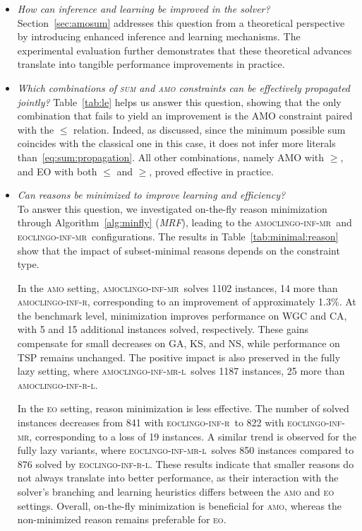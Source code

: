 \documentclass[preprint,authoryear]{elsarticle}
\newcommand{\amoclingoinfr}{\textsc{amoclingo-inf-r}\xspace}
\newcommand{\amoclingoinfrlazy}{\textsc{amoclingo-inf-r-l}\xspace}
\newcommand{\amoclingoinfmr}{\textsc{amoclingo-inf-mr}\xspace}
\newcommand{\amoclingoinfmrlazy}{\textsc{amoclingo-inf-mr-l}\xspace}
\newcommand{\eoclingoinfr}{\textsc{eoclingo-inf-r}\xspace}
\newcommand{\eoclingoinfrlazy}{\textsc{eoclingo-inf-r-l}\xspace}
\newcommand{\eoclingoinfmr}{\textsc{eoclingo-inf-mr}\xspace}
\newcommand{\eoclingoinfmrlazy}{\textsc{eoclingo-inf-mr-l}\xspace}
\theoremstyle{definition}
\begin{document}
{\color{blue}
\begin{itemize}
\item[\textit{Q1}] \emph{How can inference and learning be improved in the solver?}
Section~\ref{sec:amosum} addresses this question from a theoretical perspective by introducing enhanced inference and learning mechanisms. The experimental evaluation further demonstrates that these theoretical advances translate into tangible performance improvements in practice.

\item[\textit{Q3}] \emph{Which combinations of \textsc{sum} and \textsc{amo} constraints can be effectively propagated jointly?}
Table~\ref{tab:le} helps us answer this question, showing that the only combination that fails to yield an improvement is the AMO constraint paired with the $\le$ relation. Indeed, as discussed, since the minimum possible sum coincides with the classical one in this case, it does not infer more literals than~\eqref{eq:sum:propagation}. All other combinations, namely AMO with $\ge$, and EO with both $\le$ and $\ge$, proved effective in practice.

\item[\textit{Q4}] \emph{Can reasons be minimized to improve learning and efficiency?}\\
To answer this question, we investigated on-the-fly reason minimization through Algorithm~\ref{alg:minfly} (\textit{MRF}), leading to the \amoclingoinfmr\ and \eoclingoinfmr\ configurations. The results in Table~\ref{tab:minimal:reason} show that the impact of subset-minimal reasons depends on the constraint type.

In the \textsc{amo} setting, \amoclingoinfmr\ solves 1102 instances, 14 more than \amoclingoinfr, corresponding to an improvement of approximately 1.3\%. At the benchmark level, minimization improves performance on WGC and CA, with 5 and 15 additional instances solved, respectively. These gains compensate for small decreases on GA, KS, and NS, while performance on TSP remains unchanged. The positive impact is also preserved in the fully lazy setting, where \amoclingoinfmrlazy\ solves 1187 instances, 25 more than \amoclingoinfrlazy.

In the \textsc{eo} setting, reason minimization is less effective. The number of solved instances decreases from 841 with \eoclingoinfr\ to 822 with \eoclingoinfmr, corresponding to a loss of 19 instances. A similar trend is observed for the fully lazy variants, where \eoclingoinfmrlazy\ solves 850 instances compared to 876 solved by \eoclingoinfrlazy. These results indicate that smaller reasons do not always translate into better performance, as their interaction with the solver's branching and learning heuristics differs between the \textsc{amo} and \textsc{eo} settings. Overall, on-the-fly minimization is beneficial for \textsc{amo}, whereas the non-minimized reason remains preferable for \textsc{eo}.


\end{itemize}}
\end{document}
